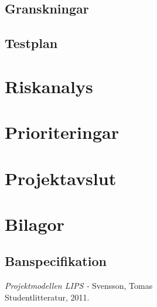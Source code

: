 \documentclass[a4paper,12pt]{article}
\begin{document}
\subsection{Granskningar}
\subsection{Testplan}

\section{Riskanalys} %

\section{Prioriteringar}


\section{Projektavslut} %



\newpage
\appendix
\section{Bilagor} \label{app:rules}


\subsection{Banspecifikation} \label{app:bana}

\newpage


\begin{thebibliography}{99}
\textit{Projektmodellen LIPS - } Svensson, Tomas
\\Studentlitteratur, 2011.
\end{thebibliography}
\end{document}
